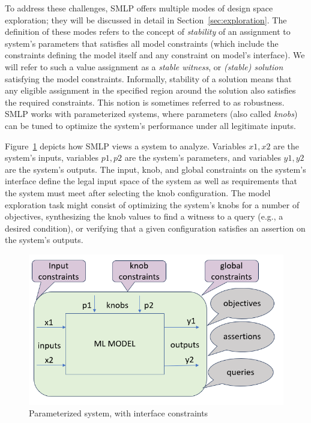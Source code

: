 \documentclass[a4paper,parskip=half]{article} %
\begin{document}
To address these challenges, SMLP offers multiple modes of design space exploration; they will be discussed in detail in Section~\ref{sec:exploration}.
The definition of these modes refers to the concept of \emph{stability} of an assignment to system's parameters that satisfies all model constraints 
(which include the constraints defining the model itself and any constraint on model's interface).
We will refer to such a value assignment as a \emph{stable witness}, or \emph{(stable) solution} satisfying the model constraints. 
Informally, stability of a solution means that any eligible assignment in the specified region around the solution also satisfies the required constraints.
This notion is sometimes referred to as robustness. SMLP works with parameterized systems, where parameters (also called \emph{knobs}) can 
be tuned to optimize the system's performance under all legitimate inputs. 

Figure~\ref{fig:system} depicts how SMLP views a system to analyze.
Variables $x1,x2$ are the system's inputs, variables $p1,p2$ are the system's parameters, and variables $y1,y2$ are the system's outputs.
The input, knob, and global constraints on the system's interface define the legal input space of the system as well as requirements that
the system must meet after selecting the knob configuration. The model exploration task might consist of optimizing the system's knobs for 
a number of objectives, synthesizing the knob values to find a witness to a query (e.g., a desired condition), or verifying that a given 
configuration satisfies an assertion on the system's outputs.

\begin{figure}[hb!]
\begin{center}
\includegraphics[height=11\baselineskip]{smlp_encoding.PNG}
\caption{Parameterized system, with interface constraints}
\label{fig:system}
\end{center}
\end{figure}
\end{document}
